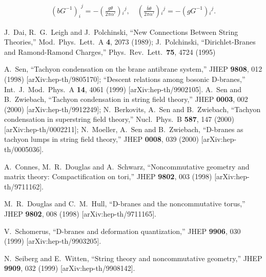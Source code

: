 \documentclass[a4paper,12pt]{article}
\begin{document}
\begin{eqnarray}
 \label{Agth}
{\left(bG^{-1} \right)_i}^j
= -
\left(
\frac{g\theta}{2\pi\alpha'}
\right)\!{{}_{i}}^j ,\quad
\left(
\frac{\bar{b}\theta}{2\pi\alpha'}
\right)\!{{}_{i}}^j
=
-\left(
gG^{-1}
\right)\!{{}_i}^j.
\end{eqnarray}
\newpage
\begin{thebibliography}{999}
\parskip=-3pt


J.~Dai, R.~G.~Leigh and J.~Polchinski,
``New Connections Between String Theories,''
Mod.\ Phys.\ Lett.\ A {\bf 4}, 2073 (1989);
J.~Polchinski,
``Dirichlet-Branes and Ramond-Ramond Charges,''
Phys.\ Rev.\ Lett.\  {\bf 75}, 4724 (1995)

A.~Sen,
``Tachyon condensation on the brane antibrane system,''
JHEP {\bf 9808}, 012 (1998)
[arXiv:hep-th/9805170];
``Descent relations among bosonic D-branes,''
Int.\ J.\ Mod.\ Phys.\ A {\bf 14}, 4061 (1999)
[arXiv:hep-th/9902105].
A.~Sen and B.~Zwiebach,
``Tachyon condensation in string field theory,''
JHEP {\bf 0003}, 002 (2000)
[arXiv:hep-th/9912249];
N.~Berkovits, A.~Sen and B.~Zwiebach,
``Tachyon condensation in superstring field theory,''
Nucl.\ Phys.\ B {\bf 587}, 147 (2000)
[arXiv:hep-th/0002211];
N.~Moeller, A.~Sen and B.~Zwiebach,
``D-branes as tachyon lumps in string field theory,''
JHEP {\bf 0008}, 039 (2000)
[arXiv:hep-th/0005036].



A.~Connes, M.~R.~Douglas and A.~Schwarz,
``Noncommutative geometry and matrix theory: Compactification on tori,''
JHEP {\bf 9802}, 003 (1998)
[arXiv:hep-th/9711162].

M.~R.~Douglas and C.~M.~Hull,
``D-branes and the noncommutative torus,''
JHEP {\bf 9802}, 008 (1998)
[arXiv:hep-th/9711165].


V.~Schomerus,
``D-branes and deformation quantization,''
JHEP {\bf 9906}, 030 (1999)
[arXiv:hep-th/9903205].


N.~Seiberg and E.~Witten,
``String theory and noncommutative geometry,''
JHEP {\bf 9909}, 032 (1999)
[arXiv:hep-th/9908142].






\end{thebibliography}
\end{document}
